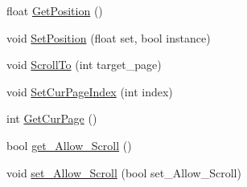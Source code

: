 \begin{DoxyCompactItemize}
float \hyperlink{class_g_u_i_pager_a648d99e4c3b4795914b6f6ac0fd8f403}{Get\+Position} ()
\item 
void \hyperlink{class_g_u_i_pager_af00c176bfa80f8eace1f03998cece1cb}{Set\+Position} (float set, bool instance)
\item 
void \hyperlink{class_g_u_i_pager_a53cae616d4a02b2fa8644f63388ed3d6}{Scroll\+To} (int target\+\_\+page)
\item 
void \hyperlink{class_g_u_i_pager_afe7f75b394d515a2b4f587c3fc9cd6d1}{Set\+Cur\+Page\+Index} (int index)
\item 
int \hyperlink{class_g_u_i_pager_a43c8309713f66f6046155421e3885e57}{Get\+Cur\+Page} ()
\item 
bool \hyperlink{class_g_u_i_pager_a1e70fb22eacdf2e8a59c1b79e987e838}{get\+\_\+\+Allow\+\_\+\+Scroll} ()
\item 
void \hyperlink{class_g_u_i_pager_a8cfd81bfcf8c2eeb8a5420651e82be14}{set\+\_\+\+Allow\+\_\+\+Scroll} (bool set\+\_\+\+Allow\+\_\+\+Scroll)
\end{DoxyCompactItemize}
